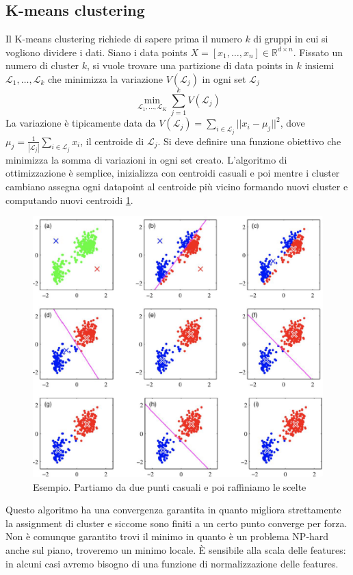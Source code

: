 	\subsection{K-means clustering}
	Il K-means clustering richiede di sapere prima il numero $k$ di gruppi in cui si vogliono dividere i dati.
	Siano i data points $X=[x_1,\dots,x_n]\in\mathbb{R}^{d\times n}$.
	Fissato un numero di cluster $k$, si vuole trovare una partizione di data points in $k$ insiemi $\mathcal{L}_1,\dots,\mathcal{L}_k$ che minimizza la variazione $V(\mathcal{L}_j)$ in ogni set $\mathcal{L}_j$
	$$\min\limits_{\mathcal{L}_1,\dots,\mathcal{L}_K}\sum\limits_{j = 1}^kV(\mathcal{L}_j)$$
	La variazione \`e tipicamente data da $V(\mathcal{L}_j) = \sum\limits_{i\in\mathcal{L}_j}||x_i-\mu_j||^2$, dove $\mu_j = \frac{1}{|\mathcal{L}_j|}\sum\limits_{i\in\mathcal{L}_j}x_i$, il centroide di $\mathcal{L}_j$.
	Si deve definire una funzione obiettivo che minimizza la somma di variazioni in ogni set creato.
	L'algoritmo di ottimizzazione \`e semplice, inizializza con centroidi casuali e poi mentre i cluster cambiano assegna ogni datapoint al centroide pi\`u vicino formando nuovi cluster e computando nuovi centroidi \ref{fig:chapter12-11}.
	\begin{figure}
		\centering
		\includegraphics[width=0.6\linewidth]{imgs/chapter12/img11}
		\caption{Esempio. Partiamo da due punti casuali e poi raffiniamo le scelte}
		\label{fig:chapter12-11}
	\end{figure}
	
	Questo algoritmo ha una convergenza garantita in quanto migliora strettamente la assignment di cluster e siccome sono finiti a un certo punto converge per forza.
	Non \`e comunque garantito trovi il minimo in quanto \`e un problema NP-hard anche sul piano, troveremo un minimo locale.
	\`E sensibile alla scala delle features: in alcuni casi avremo bisogno di una funzione di normalizzazione delle features.

